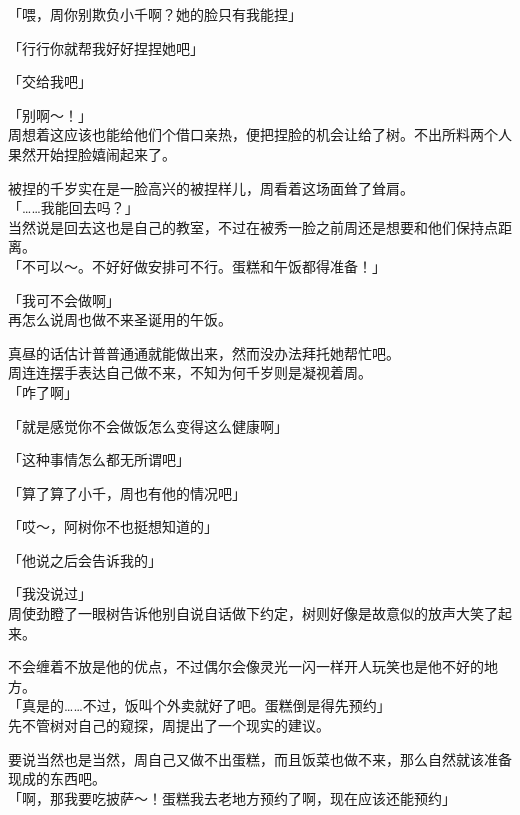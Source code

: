 「喂，周你别欺负小千啊？她的脸只有我能捏」

「行行你就帮我好好捏捏她吧」

「交给我吧」

「别啊～！」\\

周想着这应该也能给他们个借口亲热，便把捏脸的机会让给了树。不出所料两个人果然开始捏脸嬉闹起来了。

被捏的千岁实在是一脸高兴的被捏样儿，周看着这场面耸了耸肩。\\%

「……我能回去吗？」\\

当然说是回去这也是自己的教室，不过在被秀一脸之前周还是想要和他们保持点距离。\\

「不可以～。不好好做安排可不行。蛋糕和午饭都得准备！」

「我可不会做啊」\\

再怎么说周也做不来圣诞用的午饭。

真昼的话估计普普通通就能做出来，然而没办法拜托她帮忙吧。\\

周连连摆手表达自己做不来，不知为何千岁则是凝视着周。\\

「咋了啊」

「就是感觉你不会做饭怎么变得这么健康啊」

「这种事情怎么都无所谓吧」

「算了算了小千，周也有他的情况吧」

「哎～，阿树你不也挺想知道的」

「他说之后会告诉我的」

「我没说过」\\

周使劲瞪了一眼树告诉他别自说自话做下约定，树则好像是故意似的放声大笑了起来。

不会缠着不放是他的优点，不过偶尔会像灵光一闪一样开人玩笑也是他不好的地方。\\

「真是的……不过，饭叫个外卖就好了吧。蛋糕倒是得先预约」\\

先不管树对自己的窥探，周提出了一个现实的建议。

要说当然也是当然，周自己又做不出蛋糕，而且饭菜也做不来，那么自然就该准备现成的东西吧。\\

「啊，那我要吃披萨～！蛋糕我去老地方预约了啊，现在应该还能预约」

